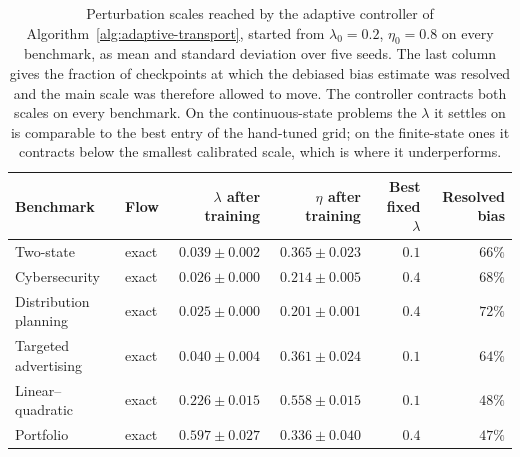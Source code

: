 \begin{table}[H]
\centering
\begin{tabular}{llrrrr}
\toprule
Benchmark & Flow & $\lambda$ after training & $\eta$ after training & Best fixed $\lambda$ & Resolved bias \\
\midrule
Two-state & exact & $0.039\pm0.002$ & $0.365\pm0.023$ & $0.1$ & $66\%$ \\
Cybersecurity & exact & $0.026\pm0.000$ & $0.214\pm0.005$ & $0.4$ & $68\%$ \\
Distribution planning & exact & $0.025\pm0.000$ & $0.201\pm0.001$ & $0.4$ & $72\%$ \\
Targeted advertising & exact & $0.040\pm0.004$ & $0.361\pm0.024$ & $0.1$ & $64\%$ \\
Linear--quadratic & exact & $0.226\pm0.015$ & $0.558\pm0.015$ & $0.1$ & $48\%$ \\
Portfolio & exact & $0.597\pm0.027$ & $0.336\pm0.040$ & $0.4$ & $47\%$ \\
\bottomrule
\end{tabular}
\caption{Perturbation scales reached by the adaptive controller of Algorithm~\ref{alg:adaptive-transport}, started from $\lambda_0=0.2$, $\eta_0=0.8$ on every benchmark, as mean and standard deviation over five seeds. The last column gives the fraction of checkpoints at which the debiased bias estimate was resolved and the main scale was therefore allowed to move. The controller contracts both scales on every benchmark. On the continuous-state problems the $\lambda$ it settles on is comparable to the best entry of the hand-tuned grid; on the finite-state ones it contracts below the smallest calibrated scale, which is where it underperforms.}
\label{tab:adaptive-scales}
\end{table}
